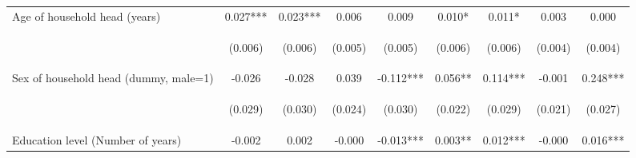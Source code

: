 \begin{center}
\begin{tabular}{lcccccccc}
Age of household head (years) & 0.027*** & 0.023*** & 0.006 & 0.009 & 0.010* & 0.011* & 0.003 & 0.000 \\
\vspace{4pt} & \begin{footnotesize}(0.006)\end{footnotesize} & \begin{footnotesize}(0.006)\end{footnotesize} & \begin{footnotesize}(0.005)\end{footnotesize} & \begin{footnotesize}(0.005)\end{footnotesize} & \begin{footnotesize}(0.006)\end{footnotesize} & \begin{footnotesize}(0.006)\end{footnotesize} & \begin{footnotesize}(0.004)\end{footnotesize} & \begin{footnotesize}(0.004)\end{footnotesize} \\
Sex of household head (dummy, male=1) & -0.026 & -0.028 & 0.039 & -0.112*** & 0.056** & 0.114*** & -0.001 & 0.248*** \\
\vspace{4pt} & \begin{footnotesize}(0.029)\end{footnotesize} & \begin{footnotesize}(0.030)\end{footnotesize} & \begin{footnotesize}(0.024)\end{footnotesize} & \begin{footnotesize}(0.030)\end{footnotesize} & \begin{footnotesize}(0.022)\end{footnotesize} & \begin{footnotesize}(0.029)\end{footnotesize} & \begin{footnotesize}(0.021)\end{footnotesize} & \begin{footnotesize}(0.027)\end{footnotesize} \\
Education level (Number of years) & -0.002 & 0.002 & -0.000 & -0.013*** & 0.003** & 0.012*** & -0.000 & 0.016*** \\

\end{tabular}
\end{center}
